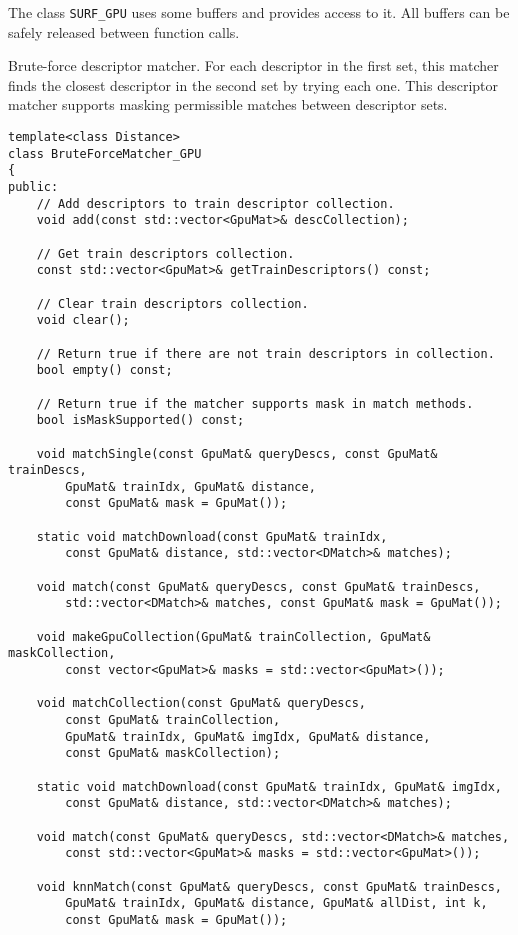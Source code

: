 The class \texttt{SURF\_GPU} uses some buffers and provides access to it. All buffers can be safely released between function calls. 

Brute-force descriptor matcher. For each descriptor in the first set, this matcher finds the closest descriptor in the second set by trying each one. This descriptor matcher supports masking permissible matches between descriptor sets.

\begin{lstlisting}
template<class Distance>
class BruteForceMatcher_GPU
{
public:
    // Add descriptors to train descriptor collection.
    void add(const std::vector<GpuMat>& descCollection);

    // Get train descriptors collection.
    const std::vector<GpuMat>& getTrainDescriptors() const;

    // Clear train descriptors collection.
    void clear();

    // Return true if there are not train descriptors in collection.
    bool empty() const;

    // Return true if the matcher supports mask in match methods.
    bool isMaskSupported() const;

    void matchSingle(const GpuMat& queryDescs, const GpuMat& trainDescs,
        GpuMat& trainIdx, GpuMat& distance,
        const GpuMat& mask = GpuMat());

    static void matchDownload(const GpuMat& trainIdx, 
        const GpuMat& distance, std::vector<DMatch>& matches);

    void match(const GpuMat& queryDescs, const GpuMat& trainDescs, 
        std::vector<DMatch>& matches, const GpuMat& mask = GpuMat());

    void makeGpuCollection(GpuMat& trainCollection, GpuMat& maskCollection,
        const vector<GpuMat>& masks = std::vector<GpuMat>());

    void matchCollection(const GpuMat& queryDescs, 
        const GpuMat& trainCollection,
        GpuMat& trainIdx, GpuMat& imgIdx, GpuMat& distance,
        const GpuMat& maskCollection);

    static void matchDownload(const GpuMat& trainIdx, GpuMat& imgIdx, 
        const GpuMat& distance, std::vector<DMatch>& matches);

    void match(const GpuMat& queryDescs, std::vector<DMatch>& matches,
        const std::vector<GpuMat>& masks = std::vector<GpuMat>());

    void knnMatch(const GpuMat& queryDescs, const GpuMat& trainDescs,
        GpuMat& trainIdx, GpuMat& distance, GpuMat& allDist, int k, 
        const GpuMat& mask = GpuMat());


\end{lstlisting}
